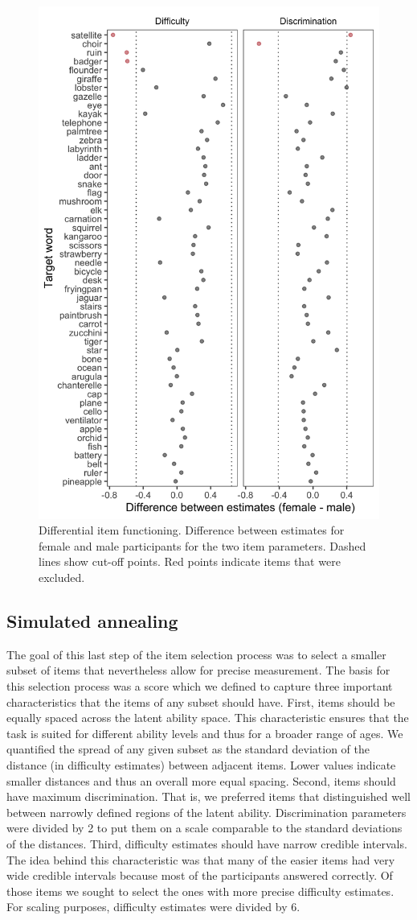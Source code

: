 \documentclass[
  man,floatsintext]{apa6}
\begin{document}
\begin{figure}

{\centering \includegraphics[width=0.5\linewidth]{../graphs/dif_fig} 

}

\caption{Differential item functioning. Difference between estimates for female and male participants for the two item parameters. Dashed lines show cut-off points. Red points indicate items that were excluded.}\label{fig:fig3}
\end{figure}

\hypertarget{simulated-annealing}{%
\subsection{Simulated annealing}\label{simulated-annealing}}

The goal of this last step of the item selection process was to select a smaller subset of items that nevertheless allow for precise measurement. The basis for this selection process was a score which we defined to capture three important characteristics that the items of any subset should have. First, items should be equally spaced across the latent ability space. This characteristic ensures that the task is suited for different ability levels and thus for a broader range of ages. We quantified the spread of any given subset as the standard deviation of the distance (in difficulty estimates) between adjacent items. Lower values indicate smaller distances and thus an overall more equal spacing. Second, items should have maximum discrimination. That is, we preferred items that distinguished well between narrowly defined regions of the latent ability. Discrimination parameters were divided by 2 to put them on a scale comparable to the standard deviations of the distances. Third, difficulty estimates should have narrow credible intervals. The idea behind this characteristic was that many of the easier items had very wide credible intervals because most of the participants answered correctly. Of those items we sought to select the ones with more precise difficulty estimates. For scaling purposes, difficulty estimates were divided by 6.
\end{document}
